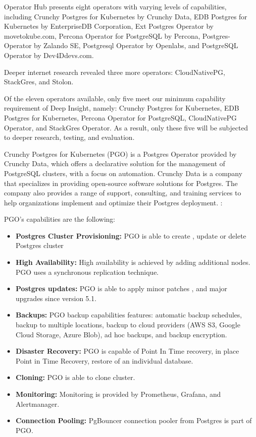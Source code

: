 Operator Hub presents eight operators with varying levels of capabilities, including Crunchy Postgres for Kubernetes by Crunchy Data, EDB Postgres for Kubernetes by EnterpriseDB Corporation, Ext Postgres Operator by movetokube.com, Percona Operator for PostgreSQL by Percona, Postgres-Operator by Zalando SE, Postgresql Operator by Openlabs, and PostgreSQL Operator by Dev4Ddevs.com.

Deeper internet research revealed three more operators: CloudNativePG, StackGres, and Stolon. \cite{PostgresOnKubernetes} \cite{PalarkComparingKubernetes}

Of the eleven operators available, only five meet our minimum capability requirement of Deep Insight, namely: Crunchy Postgres for Kubernetes, EDB Postgres for Kubernetes, Percona Operator for PostgreSQL, CloudNativePG Operator, and StackGres Operator. As a result, only these five will be subjected to deeper research, testing, and evaluation.

\pagebreak
{}
Crunchy Postgres for Kubernetes (PGO) is a Postgres Operator provided by Crunchy Data, which offers a declarative solution for the management of PostgreSQL clusters, with a focus on automation.
Crunchy Data is a company that specializes in providing open-source software solutions for Postgres. The company also provides a range of support, consulting, and training services to help organizations implement and optimize their Postgres deployment. \cite{Crunchy}:

PGO’s capabilities are the following:
\begin{itemize}
  \item \textbf{Postgres Cluster Provisioning:} PGO is able to create \cite{CrunchyDocCreate}, update \cite{CrunchyDocUpdate} or delete Postgres cluster \cite{CrunchyDocDelete}
  \item \textbf{High Availability:} High availability is achieved by adding additional nodes. PGO uses a synchronous replication technique. \cite{CrunchyDocHA}
  \item \textbf{Postgres updates:} PGO is able to apply minor patches \cite{CrunchyDocMinorUpdates}, and major upgrades since version 5.1. \cite{CrunchyBlogUpdates}
  \item \textbf{Backups:} PGO backup capabilities features: automatic backup schedules, backup to multiple locations, backup to cloud providers (AWS S3, Google Cloud Storage, Azure Blob), ad hoc backups, and backup encryption. \cite{CrunchyDocBackups}
  \item \textbf{Disaster Recovery:} PGO is capable of Point In Time recovery, in place Point in Time Recovery, restore of an individual database. \cite{CrunchyDocDisasterRecovery}
  \item \textbf{Cloning:} PGO is able to clone cluster. \cite{CrunchyDocDisasterRecovery}
  \item \textbf{Monitoring:} Monitoring is provided by Prometheus, Grafana, and Alertmanager. \cite{CrunchyDocMonitoring}
  \item \textbf{Connection Pooling:} PgBouncer connection pooler from Postgres is part of PGO. \cite{CrunchyDocConnectionPooling}
\end{itemize}

